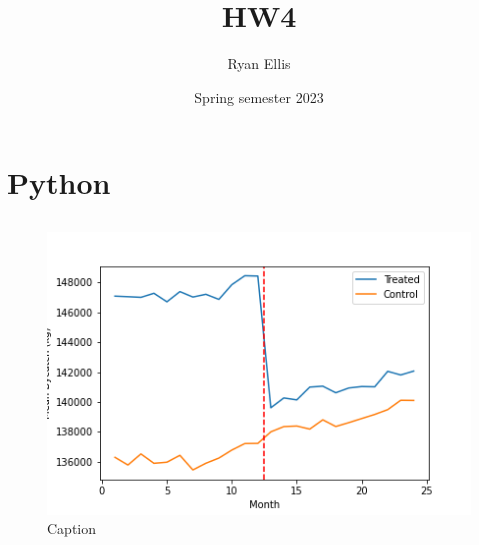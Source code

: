 \documentclass{article}
\title{HW4}
\author{Ryan Ellis}
\date{Spring semester 2023}
\begin{document}
  
\maketitle

\section{Python}
\subsection{}
\begin{figure}[h]
    \centering
    \includegraphics[scale=0.8]{homework4/output/image1.png}
    \caption{Caption}
    \label{fig:my_label}
    
\end{figure}
\end{document}
